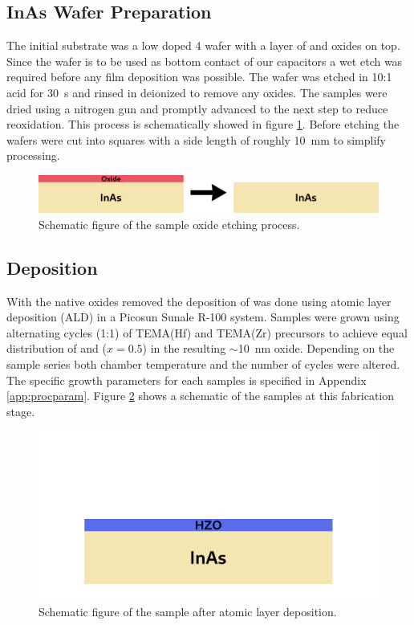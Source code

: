 \documentclass[11pt,twoside]{eitExjobb}
\begin{document}
\subsection{InAs Wafer Preparation}
The initial substrate was a low doped  \SI{4}{\inch} wafer with a
layer of  and  oxides on top. Since the wafer is to be used as
bottom contact of our capacitors a wet etch was required before any film
deposition was possible. The wafer was etched in 10:1  acid for
\SI{30}{\second} and rinsed in deionized  to remove any oxides. The
samples were dried using a nitrogen gun and promptly advanced to the next step
to reduce reoxidation. This process is schematically showed in figure
\ref{fig:fab_1}. Before etching the wafers were cut into squares with a side
length of roughly \SI{10}{\milli\meter} to simplify processing.

\begin{figure}[htbp]
    \centering
    \includegraphics[width=.70\linewidth]{fig/fabproc/fab_1.png}
    \caption{Schematic figure of the sample oxide etching process.}\label{fig:fab_1}
\end{figure}

\subsection{ Deposition}
With the native  oxides removed the deposition of 
was done using atomic layer deposition (ALD) in a Picosun Sunale R-100 system.
Samples were grown using alternating cycles (1:1) of TEMA(Hf) and TEMA(Zr)
precursors to achieve equal distribution of  and  ($x=0.5$) in
the resulting $\sim$\SI{10}{\nano\meter} oxide. Depending on the sample series
both chamber temperature and the number of cycles were altered. The specific
growth parameters for each samples is specified in Appendix \ref{app:procparam}.
Figure \ref{fig:fab_2} shows a schematic of the samples at this fabrication
stage.

\begin{figure}[htbp]
    \centering
    \includegraphics[width=.45\linewidth]{fig/fabproc/fab_2.png}
    \caption{Schematic figure of the sample after atomic layer
    deposition.}\label{fig:fab_2}
\end{figure}
\end{document}
